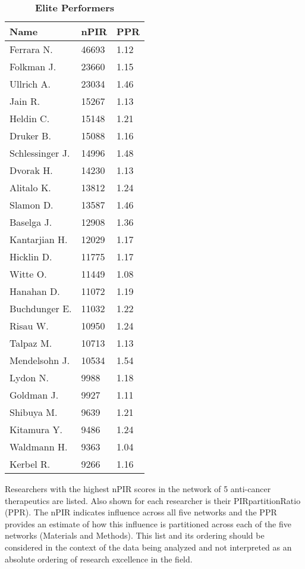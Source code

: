 \documentclass[12pt]{amsart}
\begin{document}
\begin{table}[!ht]
\centering
\caption{
{\bf Elite Performers}}
\vspace{2.5 mm}
\begin{tabular}{|l| l| l|}
\hline
Name& nPIR & PPR \\
\hline
\hline
Ferrara N.	 & 46693 & 1.12 \\ 
Folkman J. & 23660 & 1.15 \\ 
Ullrich A. & 23034 & 1.46 \\ 
Jain R. & 15267 & 1.13 \\ 
Heldin C.	& 15148 & 1.21 \\ 
Druker B.	& 15088 & 1.16 \\ 
Schlessinger J.	& 14996 & 1.48 \\ 
Dvorak H.	 & 14230 & 1.13 \\ 
 Alitalo K.	& 13812 & 1.24 \\ 
 Slamon D. & 13587 & 1.46 \\ 
 Baselga J. & 12908 & 1.36 \\ 
 Kantarjian H. & 12029 & 1.17 \\ 
 Hicklin D.	 & 11775 & 1.17 \\ 
 Witte O. & 11449 & 1.08 \\ 
 Hanahan D. & 11072 & 1.19 \\ 
 Buchdunger E.	 & 11032 & 1.22 \\ 
 Risau W.	& 10950 & 1.24 \\ 
 Talpaz M.	 & 10713 & 1.13 \\ 
 Mendelsohn J.	 & 10534 & 1.54 \\ 
 Lydon N. & 9988 & 1.18 \\ 
 Goldman J. & 9927 & 1.11 \\ 
 Shibuya M. & 9639 & 1.21 \\ 
 Kitamura Y. & 9486 & 1.24 \\ 
 Waldmann H. & 9363 & 1.04 \\ 
 Kerbel R.	 & 9266 & 1.16 \\ 
  \hline
\end{tabular}
\vspace{2.5 mm}
\begin{flushleft} Researchers with the highest nPIR scores in the network of 5 anti-cancer therapeutics are listed. Also shown for each researcher is their PIRpartitionRatio (PPR). The nPIR indicates influence across all five networks and the PPR provides an estimate of how this influence is partitioned across each of the five networks (Materials and Methods). This list and its ordering should be considered in the context of the data being analyzed and not interpreted as an absolute ordering of research excellence in the field.
\end{flushleft}
\label{table2}
\end{table}
\end{document}
